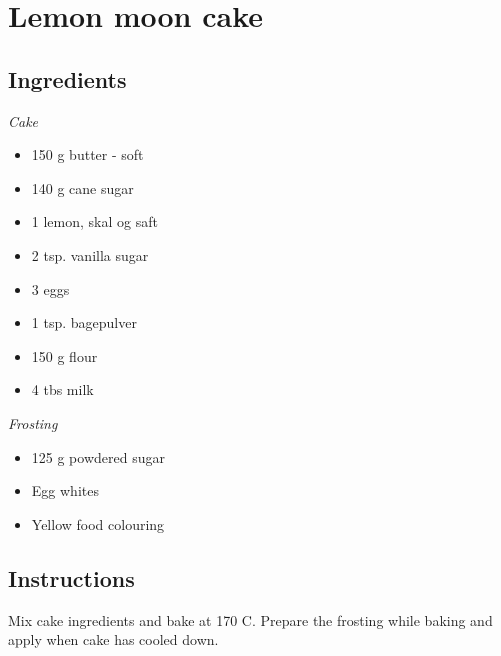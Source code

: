 \documentclass[11pt]{article}
\begin{document}
\section*{Lemon moon cake}

\subsection*{Ingredients}

\textit{Cake}
\begin{itemize}
    \item 150 g butter - soft
    \item 140 g cane sugar
    \item 1 lemon, skal og saft
    \item 2 tsp. vanilla sugar
    \item 3 eggs
    \item 1 tsp. bagepulver
    \item 150 g flour
    \item 4 tbs milk
\end{itemize}

\textit{Frosting}
\begin{itemize}
    \item 125 g powdered sugar
    \item Egg whites
    \item Yellow food colouring
\end{itemize}

\subsection*{Instructions}

Mix cake ingredients and bake at 170 C\textdegree. Prepare the frosting while baking
and apply when cake has cooled down.
\end{document}
